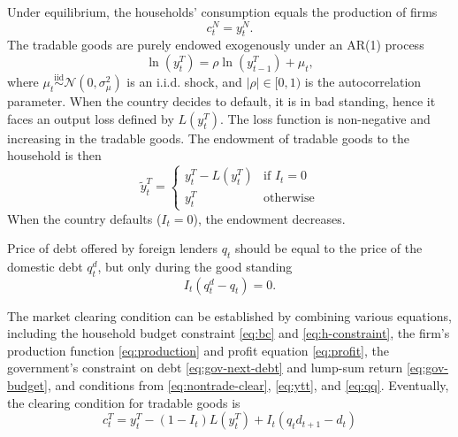 Under equilibrium, the households' consumption equals the production of firms
\begin{equation}
    \label{eq:nontrade-clear}
    c^N_{t} = y^N_t.
\end{equation}
The tradable goods are purely endowed exogenously under an AR(1) process
\begin{equation}
    \label{eq:ar1-output}
    \ln(y_t^T) = \rho \ln(y^T_{t-1}) + \mu_t,
\end{equation}
where $\mu_t \overset{\mathrm{iid}}{\sim} \mathcal{N}(0,\sigma_\mu^2)$ is an i.i.d. shock, and $ |\rho| \in [0,1)$ is the autocorrelation parameter.
When the country decides to default, it is in bad standing, hence it faces an output loss defined by $L(y^T_t)$. The loss function is non-negative and increasing in the tradable goods. The endowment of tradable goods to the household is then
\begin{equation}
    \label{eq:ytt}
    \tilde{y}^T_t =
        \begin{cases}
        y^T_t  - L(y^T_t) & \text{if } I_t = 0 \\
        y^T_t & \text{otherwise}
        \end{cases}
\end{equation}
When the country defaults ($I_t = 0$), the endowment decreases.

Price of debt offered by foreign lenders $q_t$ should be equal to the price of the domestic debt $q^d_t$, but only during the good standing
\begin{equation}
    \label{eq:qq}
    I_t(q^d_t - q_t) = 0.
\end{equation}

The market clearing condition can be established by combining various equations, including the household budget constraint \eqref{eq:bc} and \eqref{eq:h-constraint}, the firm's production function \eqref{eq:production} and profit equation \eqref{eq:profit}, the government's constraint on debt \eqref{eq:gov-next-debt} and lump-sum return \eqref{eq:gov-budget}, and conditions from \eqref{eq:nontrade-clear}, \eqref{eq:ytt}, and \eqref{eq:qq}.
Eventually, the clearing condition for tradable goods is
\begin{equation}
    \label{eq:market-clearing}
    c^T_t = y^T_t - (1 - I_t)L(y^T_t) + I_t(q_t d_{t+1} - d_t)
\end{equation}

